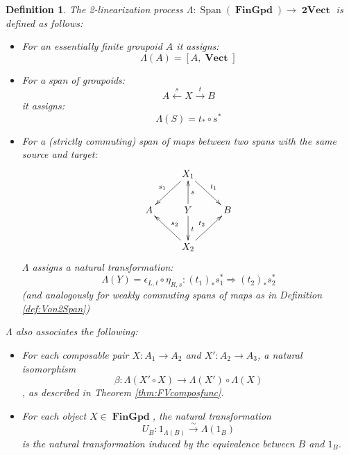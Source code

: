 \documentclass[10pt]{amsart}
\numberwithin{theorem}{subsection}
\newtheorem{definition}[theorem]{Definition}
\newcommand{\ra}{\mathop{\rightarrow}}
\newcommand{\ralim}{\mathop{\ra}\limits}
\newcommand{\la}{\mathop{\leftarrow}}
\newcommand{\lalim}{\mathop{\la}\limits}
\newcommand{\opname}[1]{\operatorname{#1}}
\newcommand{\catname}[1]{\boldsymbol{\opname{{#1}}}}
\newcommand{\Span}{\opname{Span}}
\newcommand{\V}{\catname{Vect}}
\newcommand{\iiV}{\catname{2Vect}}
\newcommand{\Gpd}{\catname{FinGpd}}
\newcommand{\HV}[1]{[#1,\V]}
\newcommand{\FV}{\Lambda}
\begin{document}
\begin{definition}\label{def:Vrep} The 2-linearization process $\FV :
\Span(\Gpd) \ra \iiV$ is defined as
follows: \begin{itemize}
\item For an essentially finite groupoid $A$ it assigns:
\begin{equation}\label{eq:VonGpd}
  \FV(A) = \HV{A}
\end{equation}
\item For a span of groupoids:
\begin{equation}
A \lalim^{s} X \ralim^{t} B
\end{equation}
it assigns:
\begin{equation}\label{eq:VonSpan}
  \FV(S) = t_{\ast} \circ s^{\ast}
\end{equation}
\item For a (strictly commuting) span of maps between two spans with the
      same source and target:
\begin{equation}
\xymatrix{
 & X_1 \ar[dl]_{s_1} \ar[dr]^{t_1} & \\
A & Y \ar[u]_{s} \ar[d]^{t} & B  \\
 & X_2  \ar[ul]_{s_2} \ar[ur]^{t_2} & \\
}
\end{equation}
$\FV$ assigns a natural transformation:
\begin{equation}
\FV(Y) = \epsilon_{L,t} \circ \eta_{R,s} : (t_1)_{\ast}s_1^{\ast} \Longrightarrow (t_2)_{\ast}s_2^{\ast}
\end{equation}
(and analogously for weakly commuting spans of maps as in Definition
\ref{def:Von2Span})
\end{itemize}
$\FV$ also associates the following:
\begin{itemize}
\item For each composable pair $X : A_1 \ra A_2$ and $X' : A_2 \ra A_3$, a natural isomorphism
\begin{equation}
 \beta : \FV( X' \circ X ) \ra \FV(X') \circ \FV(X)
\end{equation}, as described in Theorem \ref{thm:FVcomposfunc}.
\item For each object $X \in \Gpd$, the natural transformation
\begin{equation} U_B : 1_{\FV(B)} \stackrel{\sim}{\ra} \FV(1_B) \end{equation}
is the natural transformation induced by the equivalence between
$ {B}$ and $ {1_B}$. 
\end{itemize} 
\end{definition}
\end{document}
